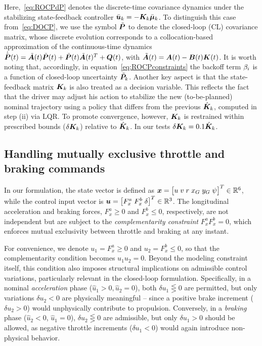 Here,~\eqref{eq:ROCPdP} denotes the discrete-time covariance dynamics under the stabilizing state-feedback controller \( \bar{\boldsymbol{u}}_k = -\boldsymbol{K}_k \bar{\boldsymbol{\mu}}_k \). To distinguish this case from~\eqref{eq:DOCP}, we use the symbol \( \tilde{\boldsymbol{P}} \) to denote the closed-loop (CL) covariance matrix, whose discrete evolution corresponds to a collocation-based approximation of the continuous-time dynamics $\dot{\tilde{\boldsymbol{P}}}(t) = \tilde{\boldsymbol{A}}(t) \tilde{\boldsymbol{P}}(t) + \tilde{\boldsymbol{P}}(t)\tilde{\boldsymbol{A}}(t)^T + \boldsymbol{Q}(t)$, with $\tilde{\boldsymbol{A}}(t)=\boldsymbol{A}(t)-\boldsymbol{B}(t)\boldsymbol{K}(t)$. It is worth noting that, accordingly, in equation~\eqref{eq:ROCPconstraints} the backoff term $\beta_i$ is a function of closed-loop uncertainty $\tilde{\boldsymbol{P}}_k$. Another key aspect is that the state-feedback matrix $\boldsymbol{K}_k$ is also treated as a decision variable. This reflects the fact that the driver may adjust his action to stabilize the new (to-be-planned) nominal trajectory using a policy that differs from the previous $\hat{\boldsymbol{K}}_k$, computed in step (ii) via LQR. To promote convergence, however, $\boldsymbol{K}_k$ is restrained within prescribed bounds ($\delta \boldsymbol{K}_k$) relative to $\hat{\boldsymbol{K}}_k$. In our tests $\delta \boldsymbol{K}_k = 0.1 \hat{\boldsymbol{K}}_k$.

\subsection{Handling mutually exclusive throttle and braking commands}
In our formulation, the state vector is defined as $\boldsymbol{x}=\big[u\;v\;r\;x_{G}\;y_{G}\;\psi \big]^T\in\mathbb{R}^6$, while the control input vector is $\boldsymbol{u}=\big[F_x^a\;F_x^b\;\delta \big]^T\in\mathbb{R}^3$. The longitudinal acceleration and braking forces, $F_x^a \geq 0$ and $F_x^b \leq 0$, respectively, are not independent but are subject to the \emph{complementarity constraint} $F_x^a F_x^b = 0$, which enforces mutual exclusivity between throttle and braking at any instant.

For convenience, we denote $u_1 = F_x^a \geq 0$ and $u_2 = F_x^b \leq 0$, so that the complementarity condition becomes $u_1 u_2 = 0$. Beyond the modeling constraint itself, this condition also imposes structural implications on admissible control variations, particularly relevant in the closed-loop formulation. 
Specifically, in a nominal \emph{acceleration} phase ($\hat{u}_1 > 0, \hat{u}_2 = 0$), both \(\delta u_1 \lesseqgtr 0\) are permitted, but only variations $\delta u_2 < 0$ are physically meaningful -- since a positive brake increment ($\delta u_2 > 0$) would unphysically contribute to propulsion. Conversely, in a \emph{braking} phase ($\hat{u}_2 < 0$, $\hat{u}_1 = 0$), $\delta u_2 \lesseqgtr 0$ are admissible, but only $\delta u_1 > 0$ should be allowed, as negative throttle increments ($\delta u_1 < 0$) would again introduce non-physical behavior.

